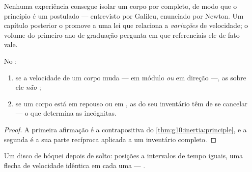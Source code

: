 \begin{remark}
Nenhuma experiência consegue isolar um corpo por completo, de modo que o
princípio é um postulado --- entrevisto por Galileu, enunciado por
Newton. Um capítulo posterior o promove a uma lei que relaciona  a
\emph{variações} de velocidade; o volume do primeiro ano de graduação
pergunta em que referenciais ele de fato vale.
\end{remark}

\begin{proposition}\label{prop:g10:inertia:converse}
No :
\begin{enumerate}
  \item se a velocidade de um corpo muda --- em módulo \emph{ou} em
        direção ---, as  sobre ele \emph{não} ;
  \item se um corpo está em repouso ou em ,
        as  do seu inventário têm de se cancelar --- o que
        determina as incógnitas.
\end{enumerate}
\end{proposition}

\begin{proof}
A primeira afirmação é a contrapositiva do
\cref{thm:g10:inertia:principle}, e a segunda é a sua parte recíproca
aplicada a um inventário completo.
\end{proof}

\begin{omfigure}

{\small Um disco de hóquei depois de solto: posições a intervalos de
tempo iguais, uma flecha de velocidade idêntica em cada uma ---
.}
\end{omfigure}


